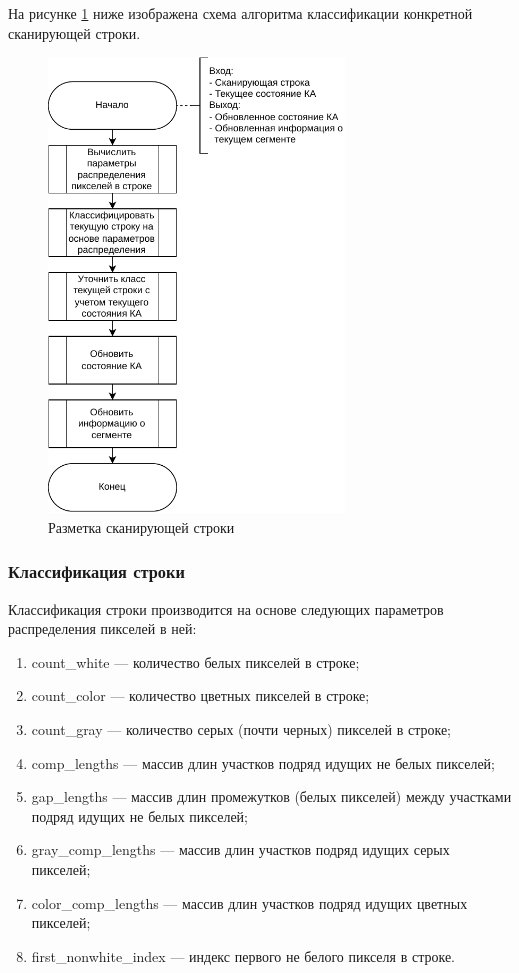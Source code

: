 На рисунке \ref{fig:primary-markup} ниже изображена схема алгоритма классификации конкретной сканирующей строки.

\begin{figure}[H]
	\centering
	\includegraphics[width=0.7\textwidth]{diag/primary-markup.pdf}
	\caption{Разметка сканирующей строки}
	\label{fig:primary-markup}
\end{figure}

\subsubsection*{Классификация строки}

Классификация строки производится на основе следующих параметров распределения пикселей в ней:
\begin{enumerate}
    \item count\_white --- количество белых пикселей в строке;
    \item count\_color --- количество цветных пикселей в строке;
    \item count\_gray --- количество серых (почти черных) пикселей в строке;
    \item comp\_lengths --- массив длин участков подряд идущих не белых пикселей;
    \item gap\_lengths --- массив длин промежутков (белых пикселей) между участками подряд идущих не белых пикселей;
    \item gray\_comp\_lengths --- массив длин участков подряд идущих серых пикселей;
    \item color\_comp\_lengths --- массив длин участков подряд идущих цветных пикселей;
    \item first\_nonwhite\_index --- индекс первого не белого пикселя в строке.
\end{enumerate}

